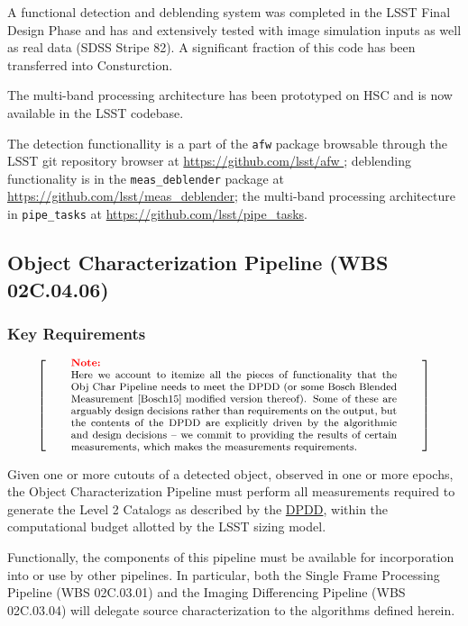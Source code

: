 \documentclass[12pt]{article}
\newcommand{\ds}[2]{{\color{blue} \href{https://docushare.lsstcorp.org/docushare/dsweb/Get/#1}{#2}}\xspace}
\newcommand{\DPDD}{\ds{LSE-163}{DPDD}}
\newcommand{\wbsSFM}{WBS 02C.03.01}
\newcommand{\wbsDiffim}{WBS 02C.03.04}
\newcommand{\wbsObjChar}{WBS 02C.04.06}
\newenvironment{note}[1][Note]
{
  \begin{displaymath}
    \left[ \qquad
    \begin{minipage}[h]{.75\linewidth}
      \color{red} \footnotesize
      \textbf{#1:} \newline
      \color{black}
}
{
    \end{minipage}
    \normalsize
    \qquad \right]
  \end{displaymath}
}
\begin{document}
A functional detection and deblending system was completed in the LSST Final Design Phase and has and extensively tested with image simulation inputs as well as real data (SDSS Stripe 82). A significant fraction of this code has been transferred into Consturction.

The multi-band processing architecture has been prototyped on HSC and is now available in the LSST codebase.

The detection functionallity is a part of the {\tt afw} package browsable through the LSST git repository browser at \url{https://github.com/lsst/afw }; deblending functionality is in the {\tt meas\_deblender} package at \url{https://github.com/lsst/meas_deblender}; the multi-band processing architecture in \texttt{pipe\_tasks} at \url{https://github.com/lsst/pipe_tasks}.

\clearpage

\subsection{Object Characterization Pipeline (\wbsObjChar)}

\subsubsection{Key Requirements}

\begin{note}
Here we account to itemize all the pieces of functionality that the Obj Char Pipeline needs to meet the DPDD (or some Bosch Blended Measurement \cite{Bosch15} modified version thereof). Some of these are arguably design decisions rather than requirements on the output, but the contents of the DPDD are explicitly driven by the algorithmic and design decisions -- we commit to providing the results of certain measurements, which makes the measurements requirements.
\end{note}

Given one or more cutouts of a detected object, observed in one or more epochs, the Object Characterization Pipeline must perform all measurements required to generate the Level 2 Catalogs as described by the \DPDD{}, within the computational budget allotted by the LSST sizing model.

Functionally, the components of this pipeline must be available for incorporation into or use by other pipelines. In particular, both the Single Frame Processing Pipeline (\wbsSFM) and the Imaging Differencing Pipeline (\wbsDiffim) will delegate source characterization to the algorithms defined herein.
\end{document}
